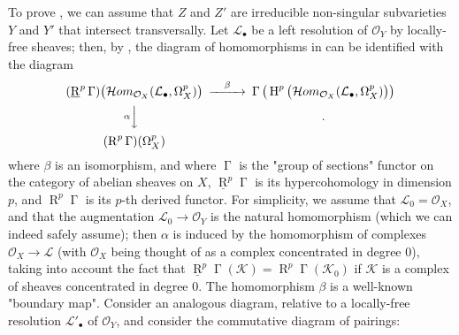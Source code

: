 \begin{cproof}
  To prove , we can assume that $Z$ and $Z'$ are irreducible non-singular subvarieties $Y$ and $Y'$ that intersect transversally.
  Let $\mathcal{L}_\bullet$ be a left resolution of $\mathcal{O}_Y$ by locally-free sheaves;
  then, by , the diagram of homomorphisms in  can be identified with the diagram
  \[
    \begin{CD}
      (\underline{\operatorname{R}}^p\operatorname{\Gamma})\big(\mathcal{H}om_{\mathcal{O}_X}(\mathcal{L}_\bullet,\Omega_X^p)\big) @>\beta>> \operatorname{\Gamma}\big(\operatorname{H}^p\big(\mathcal{H}om_{\mathcal{O}_X}(\mathcal{L}_\bullet,\Omega_X^p)\big)\big)
      \\@V\alpha VV .
      \\(\operatorname{R}^p\operatorname{\Gamma})(\Omega_X^p)
    \end{CD}
  \]
  where $\beta$ is an isomorphism, and where $\operatorname{\Gamma}$ is the "group of sections" functor on the category of abelian sheaves on $X$, $\underline{\operatorname{R}}^p\operatorname{\Gamma}$ is its hypercohomology in dimension $p$, and $\operatorname{R}^p\operatorname{\Gamma}$ is its $p$-th derived functor.
  For simplicity, we assume that $\mathcal{L}_0=\mathcal{O}_X$, and that the augmentation $\mathcal{L}_0\to\mathcal{O}_Y$ is the natural homomorphism (which we can indeed safely assume);
  then $\alpha$ is induced by the homomorphism of complexes $\mathcal{O}_X\to\mathcal{L}$ (with $\mathcal{O}_X$ being thought of as a complex concentrated in degree $0$), taking into account the fact that $\underline{\operatorname{R}}^p\operatorname{\Gamma}(\mathcal{K})=\operatorname{R}^p\operatorname{\Gamma}(\mathcal{K}_0)$ if $\mathcal{K}$ is a complex of sheaves concentrated in degree $0$.
  The homomorphism $\beta$ is a well-known "boundary map".
  Consider an analogous diagram, relative to a locally-free resolution $\mathcal{L}'_\bullet$ of $\mathcal{O}_Y$, and consider the commutative diagram of pairings:


\end{cproof}
